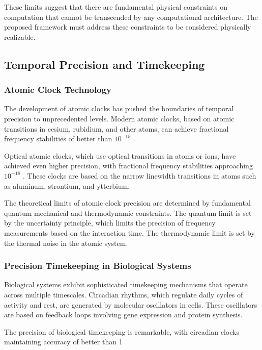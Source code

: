 \documentclass[12pt,a4paper]{article}
\theoremstyle{definition}
\begin{document}
{These limits suggest that there are fundamental physical constraints on computation that cannot be transcended by any computational architecture. The proposed framework must address these constraints to be considered physically realizable.

\subsection{Temporal Precision and Timekeeping}

\subsubsection{Atomic Clock Technology}

The development of atomic clocks has pushed the boundaries of temporal precision to unprecedented levels. Modern atomic clocks, based on atomic transitions in cesium, rubidium, and other atoms, can achieve fractional frequency stabilities of better than $10^{-15}$ \cite{ludlow2015optical}.

Optical atomic clocks, which use optical transitions in atoms or ions, have achieved even higher precision, with fractional frequency stabilities approaching $10^{-18}$ \cite{bloom2014optical}. These clocks are based on the narrow linewidth transitions in atoms such as aluminum, strontium, and ytterbium.

The theoretical limits of atomic clock precision are determined by fundamental quantum mechanical and thermodynamic constraints. The quantum limit is set by the uncertainty principle, which limits the precision of frequency measurements based on the interaction time. The thermodynamic limit is set by the thermal noise in the atomic system.

\subsubsection{Precision Timekeeping in Biological Systems}

Biological systems exhibit sophisticated timekeeping mechanisms that operate across multiple timescales. Circadian rhythms, which regulate daily cycles of activity and rest, are generated by molecular oscillators in cells. These oscillators are based on feedback loops involving gene expression and protein synthesis.

The precision of biological timekeeping is remarkable, with circadian clocks maintaining accuracy of better than 1%

}
\end{document}
